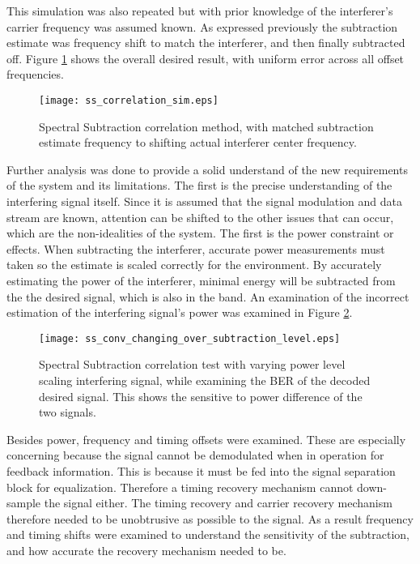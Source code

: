 This simulation was also repeated but with prior knowledge of the interferer's carrier frequency was assumed known.  As expressed previously the subtraction estimate was frequency shift to match the interferer, and then finally subtracted off.  Figure \ref{ss_correlate_GG} shows the overall desired result, with uniform error across all offset frequencies.\\

\begin{figure}[!ht]
\centering
\texttt{[image: ss\_correlation\_sim.eps]}
\caption{Spectral Subtraction correlation method, with matched subtraction estimate frequency to shifting actual interferer center frequency.}
\label{ss_correlate_GG}
\end{figure} 

Further analysis was done to provide a solid understand of the new requirements of the system and its limitations.  The first is the precise understanding of the interfering signal itself.  Since it is assumed that the signal modulation and data stream are known, attention can be shifted to the other issues that can occur, which are the non-idealities of the system.  The first is the power constraint or effects.  When subtracting the interferer, accurate power measurements must taken so the estimate is scaled correctly for the environment.  By accurately estimating the power of the interferer, minimal energy will be subtracted from the the desired signal, which is also in the band.  An examination of the incorrect estimation of the interfering signal's power was examined in Figure \ref{fig:power_delta}.

\begin{figure}[!ht]  
\centering
\texttt{[image: ss\_conv\_changing\_over\_subtraction\_level.eps]}
\caption{Spectral Subtraction correlation test with varying power level scaling interfering signal, while examining the BER of the decoded desired signal.  This shows the sensitive to power difference of the two signals.}
\label{fig:power_delta}
\end{figure}

Besides power, frequency and timing offsets were examined.  These are especially concerning because the signal cannot be demodulated when in operation for feedback information. This is because it must be fed into the signal separation block for equalization.  Therefore a timing recovery mechanism cannot down-sample the signal either.  The timing recovery and carrier recovery mechanism therefore needed to be unobtrusive as possible to the signal.  As a result frequency and timing shifts were examined to understand the sensitivity of the subtraction, and how accurate the recovery mechanism needed to be.

